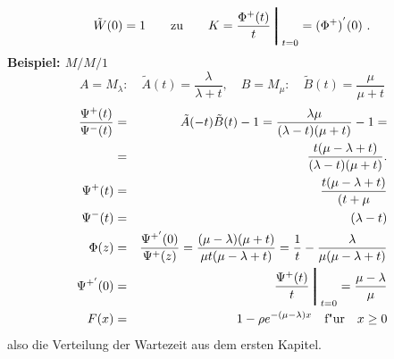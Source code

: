 \begin{displaymath}
\tilde W (0) = 1 \qquad \mbox{zu} \qquad
K = \frac{\Phi^{+}(t)}{t} \Bigg \bracevert_{t=0} = (\Phi^{+})^{'}(0) ~.
\end{displaymath}
{\bf Beispiel: $M/M/1$} 
\begin{displaymath}
A = M_{\lambda}: \quad \tilde A(t) = \frac{\lambda}{\lambda + t}, \quad
B = M_{\mu}: \quad \tilde B(t) =\frac{\mu}{\mu +t}
\end{displaymath}
\begin{eqnarray*}
\frac{\Psi^{+}(t)}{\Psi^{-}(t)} &=& \tilde A(-t) \tilde B(t)-1 = 
\frac{\lambda \mu}{(\lambda - t)(\mu + t)} - 1 = \\
 &=& \frac{t(\mu - \lambda + t)}{(\lambda - t)(\mu + t)}. \\
\Psi^{+}(t) &=& \frac{t(\mu -\lambda + t)}{(t + \mu} \\
\Psi^{-}(t) &=& (\lambda - t) \\
\Phi (z) &=& \frac{\Psi^{+'}(0)}{\Psi^{+}(z)} =
\frac{(\mu - \lambda)(\mu +t)}{\mu t(\mu - \lambda + t)} =
\frac{1}{t} - \frac{\lambda}{\mu(\mu - \lambda + t)} \\
\Psi^{+'}(0) &=& \frac{\Psi^{+}(t)}{t} \Bigg \bracevert_{t=0} =\frac{\mu -
\lambda}{\mu} \\
F(x) &=& 1 - \rho e^{-(\mu - \lambda)x} \quad \mbox{f"ur} \quad x \geq 0
\end{eqnarray*}
also die Verteilung der Wartezeit aus dem ersten Kapitel.
